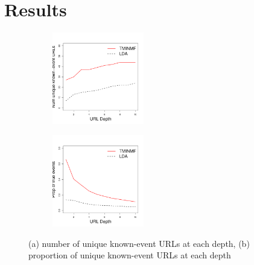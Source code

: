 \documentclass{sig-alternate}
\begin{document}
\section{Results}
\begin{figure}
\centering
\begin{subfigure}{.25\textwidth}
  \centering
\includegraphics[width=4cm]{plots/events_at_depth.pdf}
\end{subfigure}%
\begin{subfigure}{.25\textwidth}
  \centering
\includegraphics[width=4cm]{plots/prop_at_depth}
\end{subfigure}
\caption{(a) number of unique known-event URLs at each depth, (b) proportion of unique known-event URLs at each depth}
\label{fig.eventdist}
\end{figure}
\end{document}
